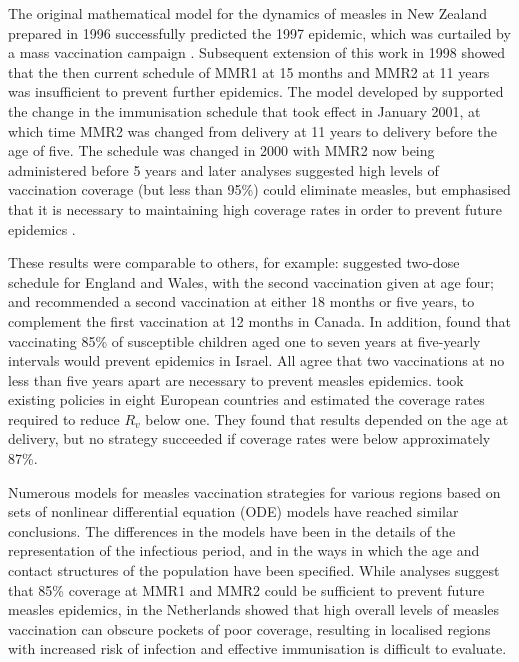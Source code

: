 \documentclass{article}
\begin{document}
The original mathematical model for the dynamics of measles in New Zealand prepared in 1996 \citep{tobias98} successfully predicted the 1997 epidemic, which was curtailed by a mass vaccination campaign \citep{mansoor98,roberts0}. Subsequent extension of this work in 1998 showed that the then current schedule of MMR1 at 15 months and MMR2 at 11 years was insufficient to prevent further epidemics. The model developed by \citep{roberts0} supported the change in the immunisation schedule that took effect in January 2001, at which time MMR2 was changed from delivery at 11 years to delivery before the age of five. The schedule was changed in 2000 with MMR2 now being administered before 5 years \citep{anon2a} and later analyses suggested high levels of vaccination coverage (but less than 95\%) could eliminate measles, but emphasised that it is necessary to maintaining high coverage rates in order to prevent future epidemics \citep{roberts4}.

These results were comparable to others, for example: \citep{babad95} suggested two-dose schedule for England and Wales, with the second vaccination given at age four; and \citep{gay98} recommended a second vaccination at either 18 months or five years, to complement the first vaccination at 12 months in Canada. In addition, \citep{agur93} found that vaccinating 85\% of susceptible children aged one to seven years at five-yearly intervals would prevent epidemics in Israel. All agree that two vaccinations at no less than five years apart are necessary to prevent measles epidemics. \citep{wallinga1} took existing policies in eight European countries and estimated the coverage rates required to reduce $R_v$ below one. They found that results depended on the age at delivery, but no strategy succeeded if coverage rates were below approximately 87\%.

Numerous models for measles vaccination strategies for various regions \citep{agur93, babad95, edmunds0, gay98, wallinga1} based on sets of nonlinear differential equation (ODE) models have reached similar conclusions. The differences in the models have been in the details of the representation of the infectious period, and in the ways in which the age and contact structures of the population have been specified. While analyses suggest that 85\% coverage at MMR1 and MMR2 could be sufficient to prevent future measles epidemics, \citep{glass4} in the Netherlands showed that high overall levels of measles vaccination can obscure pockets of poor coverage, resulting in localised regions with increased risk of infection and effective immunisation is difficult to evaluate. 
\end{document}
